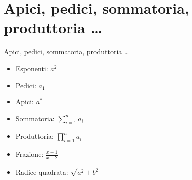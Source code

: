 \section{Apici, pedici, sommatoria, produttoria \dots}
  \begin{frame}{Apici, pedici, sommatoria, produttoria \dots}
    
    \begin{itemize}
      \item<1-> Esponenti: $a^2$
      \item<2-> Pedici: $a_1$
      \item<3-> Apici: $a^{*}$
      \item<4-> Sommatoria: $\sum_{i=1}^n a_i$
      \item<5-> Produttoria: $\prod_{i=1}^n a_i$
      \item<6-> Frazione: $\frac{x + 1}{x + 2}$
      \item<7-> Radice quadrata: $\sqrt{a^2 + b^2}$
    \end{itemize}

\end{frame}
